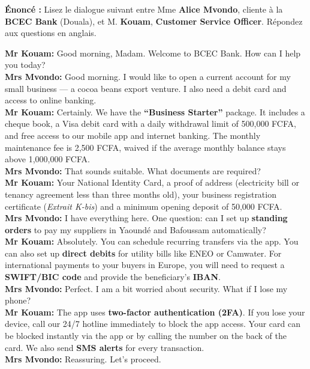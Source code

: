 \documentclass[11pt]{article}
\begin{document}
\begin{exoresolu}
    \textbf{Énoncé :} Lisez le dialogue suivant entre Mme \textbf{Alice Mvondo}, cliente à la \textbf{BCEC Bank} (Douala), et M. \textbf{Kouam}, \textbf{Customer Service Officer}. Répondez aux questions en anglais.

    \begin{textebox}
    \textbf{Mr Kouam:} Good morning, Madam. Welcome to BCEC Bank. How can I help you today?\\
    \textbf{Mrs Mvondo:} Good morning. I would like to open a current account for my small business — a cocoa beans export venture. I also need a debit card and access to online banking.\\
    \textbf{Mr Kouam:} Certainly. We have the \textbf{“Business Starter”} package. It includes a cheque book, a Visa debit card with a daily withdrawal limit of 500,000 FCFA, and free access to our mobile app and internet banking. The monthly maintenance fee is 2,500 FCFA, waived if the average monthly balance stays above 1,000,000 FCFA.\\
    \textbf{Mrs Mvondo:} That sounds suitable. What documents are required?\\
    \textbf{Mr Kouam:} Your National Identity Card, a proof of address (electricity bill or tenancy agreement less than three months old), your business registration certificate (\textit{Extrait K-bis}) and a minimum opening deposit of 50,000 FCFA.\\
    \textbf{Mrs Mvondo:} I have everything here. One question: can I set up \textbf{standing orders} to pay my suppliers in Yaoundé and Bafoussam automatically?\\
    \textbf{Mr Kouam:} Absolutely. You can schedule recurring transfers via the app. You can also set up \textbf{direct debits} for utility bills like ENEO or Camwater. For international payments to your buyers in Europe, you will need to request a \textbf{SWIFT/BIC code} and provide the beneficiary's \textbf{IBAN}.\\
    \textbf{Mrs Mvondo:} Perfect. I am a bit worried about security. What if I lose my phone?\\
    \textbf{Mr Kouam:} The app uses \textbf{two-factor authentication (2FA)}. If you lose your device, call our 24/7 hotline immediately to block the app access. Your card can be blocked instantly via the app or by calling the number on the back of the card. We also send \textbf{SMS alerts} for every transaction.\\
    \textbf{Mrs Mvondo:} Reassuring. Let's proceed.
    \end{textebox}


\end{exoresolu}
\end{document}
